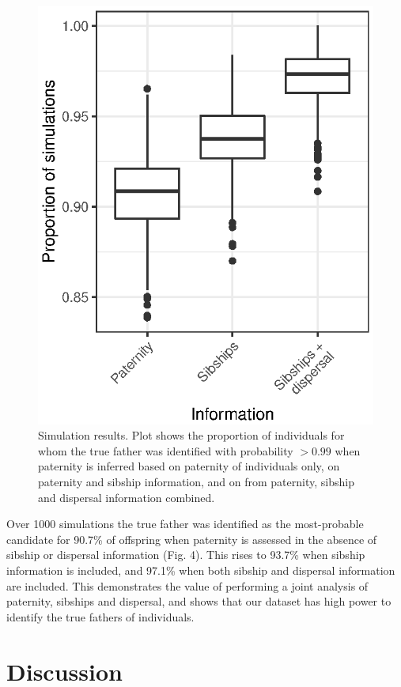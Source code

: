 \documentclass[10pt, a4paper, twocolumn]{article} %
\begin{document}
\begin{figure}
    \includegraphics{simulations.eps}
    \caption{Simulation results. Plot shows the proportion of individuals for whom the true father was identified with probability $>0.99$ when paternity is inferred based on paternity of individuals only, on paternity and sibship information, and on from paternity, sibship and dispersal information combined.}
    \label{fig:simulations}
\end{figure}

Over 1000 simulations the true father was identified as the most-probable candidate for 90.7\% of offspring when paternity is assessed in the absence of sibship or dispersal information (Fig. 4). This rises to 93.7\% when sibship information is included, and 97.1\% when both sibship and dispersal information are included. This demonstrates the value of performing a joint analysis of paternity, sibships and dispersal, and shows that our dataset has high power to identify the true fathers of individuals.

\section{Discussion}
\end{document}

